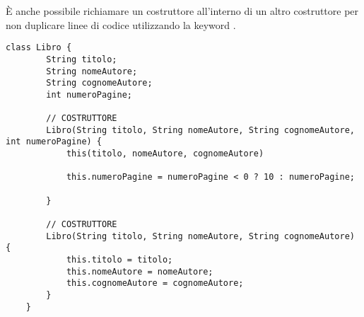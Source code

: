 \documentclass[../main.tex]{subfiles}
\begin{document}
È anche possibile richiamare un costruttore all'interno di un altro costruttore per non duplicare linee di codice utilizzando la keyword
.
\begin{lstlisting}[style=java]
    class Libro {
        String titolo;
        String nomeAutore;
        String cognomeAutore;
        int numeroPagine;

        // COSTRUTTORE
        Libro(String titolo, String nomeAutore, String cognomeAutore, int numeroPagine) {
            this(titolo, nomeAutore, cognomeAutore)    
        
            this.numeroPagine = numeroPagine < 0 ? 10 : numeroPagine;

        }

        // COSTRUTTORE
        Libro(String titolo, String nomeAutore, String cognomeAutore) {
            this.titolo = titolo;
            this.nomeAutore = nomeAutore;
            this.cognomeAutore = cognomeAutore;
        }
    }
\end{lstlisting}
\end{document}
